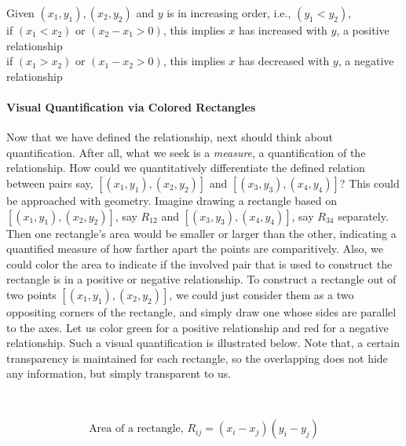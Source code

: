 \documentclass[float=false,crop=false]{standalone}
\begin{document}
Given \((x_1, y_1),(x_2, y_2)\) and \(y\) is in increasing order, i.e.,
\((y_1 < y_2)\),\\
if \((x_1 < x_2)\) or \((x_2 - x_1>0)\), this implies \(x\) has
increased with \(y\), a positive relationship\\
if \((x_1 > x_2)\) or \((x_1 - x_2>0)\), this implies \(x\) has
decreased with \(y\), a negative relationship

    \paragraph{Visual Quantification via Colored
Rectangles}\label{visual-quantification-via-colored-rectangles}

Now that we have defined the relationship, next should think about
quantification. After all, what we seek is a \emph{measure}, a
quantification of the relationship. How could we quantitatively
differentiate the defined relation between pairs say,
\([(x_1,y_1),(x_2,y_2)]\) and \([(x_3,y_3),(x_4,y_4)]\)? This could be
approached with geometry. Imagine drawing a rectangle based on
\([(x_1,y_1),(x_2,y_2)]\), say \(R_{12}\) and \([(x_3,y_3),(x_4,y_4)]\),
say \(R_{34}\) separately. Then one rectangle's area would be smaller or
larger than the other, indicating a quantified measure of how farther
apart the points are comparitively. Also, we could color the area to
indicate if the involved pair that is used to construct the rectangle is
in a positive or negative relationship. To construct a rectangle out of
two points \([(x_1,y_1),(x_2,y_2)]\), we could just consider them as a
two oppositing corners of the rectangle, and simply draw one whose sides
are parallel to the axes. Let us color green for a positive relationship
and red for a negative relationship. Such a visual quantification is
illustrated below. Note that, a certain transparency is maintained for
each rectangle, so the overlapping does not hide any information, but
simply transparent to us.
    \begin{center}
    \end{center}
    { \hspace*{\fill} \\}
    
    \begin{equation}
\text{Area of a rectangle,    } R_{ij} = (x_i - x_j)(y_i - y_j)  \label{eq:C001}
\end{equation}
\end{document}
